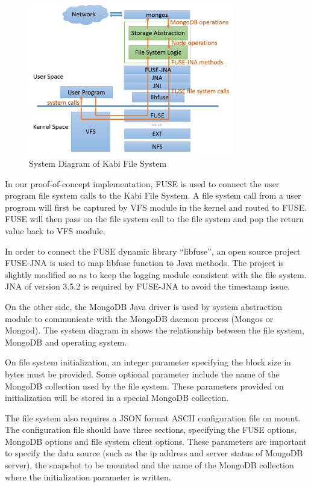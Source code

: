 \begin{figure}[hbtp]
\centering
\includegraphics[width=0.8\textwidth]{Chapter-3/figs/fig1.png}
\caption{System Diagram of Kabi File System}
\label{fig:diagram}
\end{figure}

	In our proof-of-concept implementation, FUSE is used to connect the user program file system calls to the Kabi File System. A file system call from a user program will first be captured by VFS module in the kernel and routed to FUSE. FUSE will then pass on the file system call to the file system and pop the return value back to VFS module.

    In order to connect the FUSE dynamic library “libfuse”, an open source project FUSE-JNA is used to map libfuse function to Java methods. The project is slightly modified so as to keep the logging module consistent with the file system. JNA of version 3.5.2 is required by FUSE-JNA to avoid the timestamp issue.

    On the other side, the MongoDB Java driver is used by system abstraction module to communicate with the MongoDB daemon process (Mongos or Mongod).
The system diagram in  shows the relationship between the file system, MongoDB and operating system.

    On file system initialization, an integer parameter specifying the block size in bytes must be provided. Some optional parameter include the name of the MongoDB collection used by the file system. These parameters provided on initialization will be stored in a special MongoDB collection.

    The file system also requires a JSON format ASCII configuration file on mount. The configuration file should have three sections, specifying the FUSE options, MongoDB options and file system client options. These parameters are important to specify the data source (such as the ip address and server status of MongoDB server), the snapshot to be mounted and the name of the MongoDB collection where the initialization parameter is written.
    
